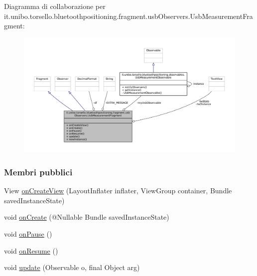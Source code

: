 Diagramma di collaborazione per it.\+unibo.\+torsello.\+bluetoothpositioning.\+fragment.\+usb\+Observers.\+Usb\+Measurement\+Fragment\+:
\nopagebreak
\begin{figure}[H]
\begin{center}
\leavevmode
\includegraphics[width=350pt]{classit_1_1unibo_1_1torsello_1_1bluetoothpositioning_1_1fragment_1_1usbObservers_1_1UsbMeasurementFragment__coll__graph}
\end{center}
\end{figure}
\subsubsection*{Membri pubblici}
\begin{DoxyCompactItemize}
\item 
View \hyperlink{classit_1_1unibo_1_1torsello_1_1bluetoothpositioning_1_1fragment_1_1usbObservers_1_1UsbMeasurementFragment_af2d8089677a375b0e8254b097072d3a5_af2d8089677a375b0e8254b097072d3a5}{on\+Create\+View} (Layout\+Inflater inflater, View\+Group container, Bundle saved\+Instance\+State)
\item 
void \hyperlink{classit_1_1unibo_1_1torsello_1_1bluetoothpositioning_1_1fragment_1_1usbObservers_1_1UsbMeasurementFragment_a232e0530117fcd2e3d1e41767a774ed1_a232e0530117fcd2e3d1e41767a774ed1}{on\+Create} (@Nullable Bundle saved\+Instance\+State)
\item 
void \hyperlink{classit_1_1unibo_1_1torsello_1_1bluetoothpositioning_1_1fragment_1_1usbObservers_1_1UsbMeasurementFragment_aa063ee103779be3e6ab9d911abbbe20b_aa063ee103779be3e6ab9d911abbbe20b}{on\+Pause} ()
\item 
void \hyperlink{classit_1_1unibo_1_1torsello_1_1bluetoothpositioning_1_1fragment_1_1usbObservers_1_1UsbMeasurementFragment_a90f1d60bb714dff32fd44d4c5f29979a_a90f1d60bb714dff32fd44d4c5f29979a}{on\+Resume} ()
\item 
void \hyperlink{classit_1_1unibo_1_1torsello_1_1bluetoothpositioning_1_1fragment_1_1usbObservers_1_1UsbMeasurementFragment_a4f0d991a19bae141e877d56737715040_a4f0d991a19bae141e877d56737715040}{update} (Observable o, final Object arg)
\end{DoxyCompactItemize}
